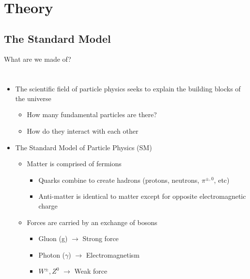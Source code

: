 \documentclass[aspectratio=169,xcolor=table]{beamer}
\begin{document}
\section{Theory }
  
  \subsection{The Standard Model }
  \begin{frame}[t]{What are we made of?}
    \begin{columns}
      \begin{itemize}
        \item The scientific field of particle physics seeks to explain the building blocks of the universe
        \begin{itemize}
          \item How many fundamental particles are there?
          \item How do they interact with each other
        \end{itemize}
        \item The Standard Model of Particle Physics (SM)
        \begin{itemize}
          \item Matter is comprised of fermions
            \begin{itemize}
              \item Quarks combine to create hadrons (protons, neutrons, $\pi^{\pm,0}$, etc)
              \item Anti-matter is identical to matter except for opposite electromagnetic charge
            \end{itemize}
          \item Forces are carried by an exchange of bosons
            \begin{itemize}
              \item Gluon (g) $\to$ Strong force
              \item Photon ($\gamma$) $\to$ Electromagnetism
              \item $W^{\pm},Z^{0}$ $\to$ Weak force
            \end{itemize}
        \end{itemize}

\end{itemize}
\end{columns}
\end{frame}
\end{document}
